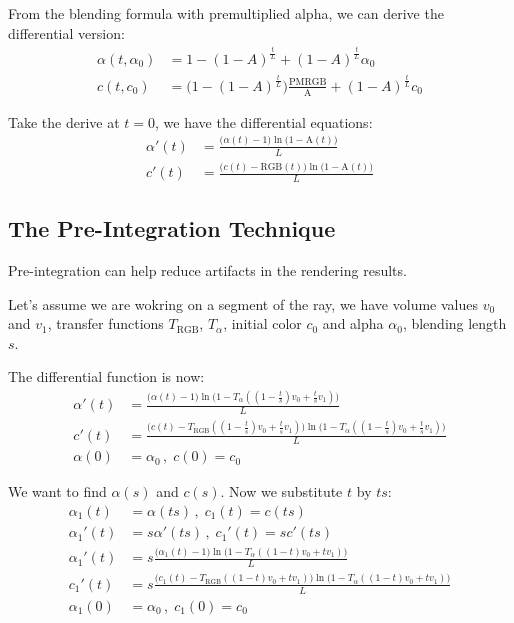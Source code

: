 \documentclass[letter, 11pt]{article}
\begin{document}
From the blending formula with premultiplied alpha, we can derive the differential version:
\begin{align*}
\alpha(t, \alpha_0) &= 1 - (1 - A) ^ {\tfrac{t}{L}} + (1 - A) ^ {\tfrac{t}{L}} \alpha_0 \\
c(t, c_0) &= \bigl(1 - (1 - A) ^ {\tfrac{t}{L}}\bigr) \frac{\mathrm{PMRGB}}{\mathrm{A}} + (1 - A) ^ {\tfrac{t}{L}} c_0
\end{align*}

\newcommand{\A}{\mathrm{A}}
\newcommand{\RGB}{\mathrm{RGB}}
\newcommand{\dd}{\mathrm{d}}

Take the derive at $t = 0$, we have the differential equations:
\begin{align}
\alpha'(t) &= \frac{\bigl(\alpha(t)-1\bigr)\ln\bigl(1-\A(t)\bigr)}{L} \\
c'(t) &= \frac{\bigl(c(t)-\RGB(t)\bigr)\ln\bigl(1-\A(t)\bigr)}{L}
\end{align}

\subsection{The Pre-Integration Technique}

Pre-integration can help reduce artifacts in the rendering results.

Let's assume we are wokring on a segment of the ray, we have volume values $v_0$ and $v_1$,
transfer functions $T_\RGB$, $T_\alpha$, initial color $c_0$ and alpha $\alpha_0$, blending length $s$.

The differential function is now:
\begin{align*}
\alpha'(t) &= \frac{\bigl(\alpha(t)-1\bigr)\ln\bigl(1-T_\alpha((1-\frac{t}{s})v_0+\frac{t}{s}v_1)\bigr)}{L} \\
c'(t) &= \frac{\bigl(c(t)-T_\RGB((1-\frac{t}{s})v_0+\frac{t}{s}v_1)\bigr)\ln\bigl(1-T_\alpha((1-\frac{t}{s})v_0+\frac{t}{s}v_1)\bigr)}{L} \\
\alpha(0) &= \alpha_0 \,,\; c(0) = c_0
\end{align*}

We want to find $\alpha(s)$ and $c(s)$. Now we substitute $t$ by $ts$:
\begin{align*}
\alpha_1(t) &= \alpha(ts) \,,\; c_1(t) = c(ts)\\
\alpha_1'(t) &= s\alpha'(ts) \,,\; c_1'(t) = s c'(ts)\\
\alpha_1'(t) &= s\frac{\bigl(\alpha_1(t)-1\bigr)\ln\bigl(1-T_\alpha((1-t)v_0+tv_1)\bigr)}{L} \\
c_1'(t) &= s\frac{\bigl(c_1(t)-T_\RGB((1-t)v_0+tv_1)\bigr)\ln\bigl(1-T_\alpha((1-t)v_0+tv_1)\bigr)}{L} \\
\alpha_1(0) &= \alpha_0 \,,\; c_1(0) = c_0
\end{align*}
\end{document}
